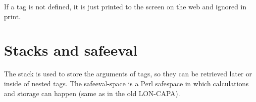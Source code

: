 If a tag is not defined, it is just printed to the screen on the web and ignored in print.

\section{Stacks and safeeval}
The stack is used to store the arguments of tags, so they can be retrieved later or inside of nested tags. The safeeval-space is a Perl safespace in which calculations and storage can happen (same as in the old LON-CAPA).


